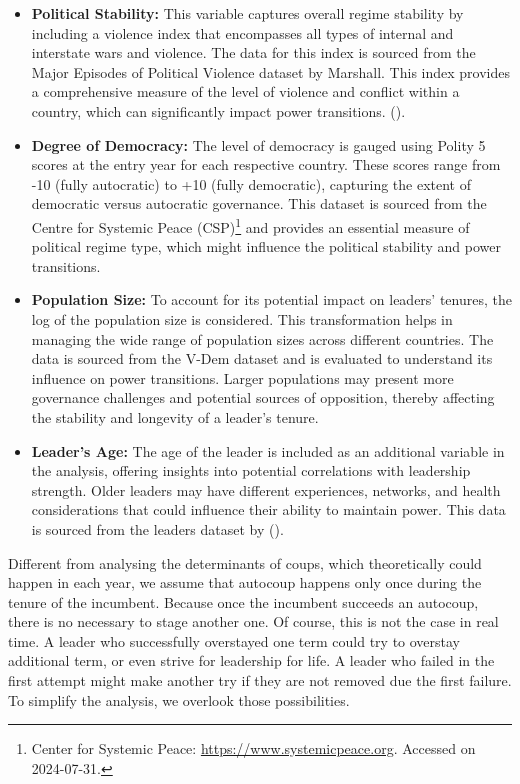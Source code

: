 \documentclass[
  12pt,
]{report}
\begin{document}
\begin{itemize}
\item
  \textbf{Political Stability:} This variable captures overall regime
  stability by including a violence index that encompasses all types of
  internal and interstate wars and violence. The data for this index is
  sourced from the Major Episodes of Political Violence dataset by
  Marshall. This index provides a comprehensive measure of the level of
  violence and conflict within a country, which can significantly impact
  power transitions. ().
\item
  \textbf{Degree of Democracy:} The level of democracy is gauged using
  Polity 5 scores at the entry year for each respective country. These
  scores range from -10 (fully autocratic) to +10 (fully democratic),
  capturing the extent of democratic versus autocratic governance. This
  dataset is sourced from the Centre for Systemic Peace (CSP)\footnote{Center
    for Systemic Peace: \url{https://www.systemicpeace.org}. Accessed on
    2024-07-31.} and provides an essential measure of political regime
  type, which might influence the political stability and power
  transitions.
\item
  \textbf{Population Size:} To account for its potential impact on
  leaders' tenures, the log of the population size is considered. This
  transformation helps in managing the wide range of population sizes
  across different countries. The data is sourced from the V-Dem dataset
  and is evaluated to understand its influence on power transitions.
  Larger populations may present more governance challenges and
  potential sources of opposition, thereby affecting the stability and
  longevity of a leader's tenure.
\item
  \textbf{Leader's Age:} The age of the leader is included as an
  additional variable in the analysis, offering insights into potential
  correlations with leadership strength. Older leaders may have
  different experiences, networks, and health considerations that could
  influence their ability to maintain power. This data is sourced from
  the leaders dataset by ().
\end{itemize}

Different from analysing the determinants of coups, which theoretically
could happen in each year, we assume that autocoup happens only once
during the tenure of the incumbent. Because once the incumbent succeeds
an autocoup, there is no necessary to stage another one. Of course, this
is not the case in real time. A leader who successfully overstayed one
term could try to overstay additional term, or even strive for
leadership for life. A leader who failed in the first attempt might make
another try if they are not removed due the first failure. To simplify
the analysis, we overlook those possibilities.
\end{document}
